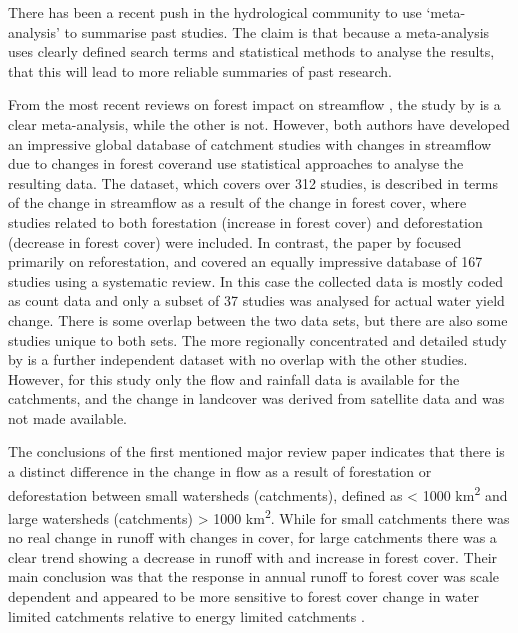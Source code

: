 \documentclass[]{elsarticle} %
\begin{document}
There has been a recent push in the hydrological community \citep{evaristo2020metaanalysis} to use `meta-analysis' to summarise past studies. The claim is that because a meta-analysis uses clearly defined search terms and statistical methods to analyse the results, that this will lead to more reliable summaries of past research.

From the most recent reviews on forest impact on streamflow \citep{zhang2017, filoso2017}, the study by \citet{filoso2017} is a clear meta-analysis, while the other is not. However, both authors have developed an impressive global database of catchment studies with changes in streamflow due to changes in forest coverand use statistical approaches to analyse the resulting data. The \citet{zhang2017} dataset, which covers over 312 studies, is described in terms of the change in streamflow as a result of the change in forest cover, where studies related to both forestation (increase in forest cover) and deforestation (decrease in forest cover) were included. In contrast, the paper by \citet{filoso2017} focused primarily on reforestation, and covered an equally impressive database of 167 studies using a systematic review. In this case the collected data is mostly coded as count data and only a subset of 37 studies was analysed for actual water yield change. There is some overlap between the two data sets, but there are also some studies unique to both sets. The more regionally concentrated and detailed study by \citet{levy2018} is a further independent dataset with no overlap with the other studies. However, for this study only the flow and rainfall data is available for the catchments, and the change in landcover was derived from satellite data and was not made available.

The conclusions of the first mentioned major review paper \citep{zhang2017} indicates that there is a distinct difference in the change in flow as a result of forestation or deforestation between small watersheds (catchments), defined as \textless{} 1000 km\textsuperscript{2} and large watersheds (catchments) \textgreater{} 1000 km\textsuperscript{2}. While for small catchments there was no real change in runoff with changes in cover, for large catchments there was a clear trend showing a decrease in runoff with and increase in forest cover. Their main conclusion was that the response in annual runoff to forest cover was scale dependent and appeared to be more sensitive to forest cover change in water limited catchments relative to energy limited catchments \citep{zhang2017}.
\end{document}
